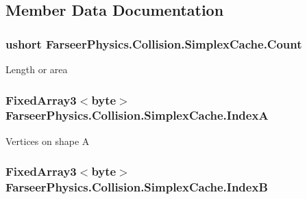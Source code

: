 \subsection{Member Data Documentation}
\hypertarget{struct_farseer_physics_1_1_collision_1_1_simplex_cache_a9331fe0cd89359cb905e3e014d6e4f90}{
\subsubsection[{Count}]{\setlength{\rightskip}{0pt plus 5cm}ushort Farseer\+Physics.\+Collision.\+Simplex\+Cache.\+Count}}\label{struct_farseer_physics_1_1_collision_1_1_simplex_cache_a9331fe0cd89359cb905e3e014d6e4f90}


Length or area 

\hypertarget{struct_farseer_physics_1_1_collision_1_1_simplex_cache_a7440f15a39586b449e3847c88d63dae5}{
\subsubsection[{Index\+A}]{\setlength{\rightskip}{0pt plus 5cm}Fixed\+Array3$<$byte$>$ Farseer\+Physics.\+Collision.\+Simplex\+Cache.\+Index\+A}}\label{struct_farseer_physics_1_1_collision_1_1_simplex_cache_a7440f15a39586b449e3847c88d63dae5}


Vertices on shape A 

\hypertarget{struct_farseer_physics_1_1_collision_1_1_simplex_cache_aa03eca90b3ee437635fecf1876181896}{
\subsubsection[{Index\+B}]{\setlength{\rightskip}{0pt plus 5cm}Fixed\+Array3$<$byte$>$ Farseer\+Physics.\+Collision.\+Simplex\+Cache.\+Index\+B}}\label{struct_farseer_physics_1_1_collision_1_1_simplex_cache_aa03eca90b3ee437635fecf1876181896}


